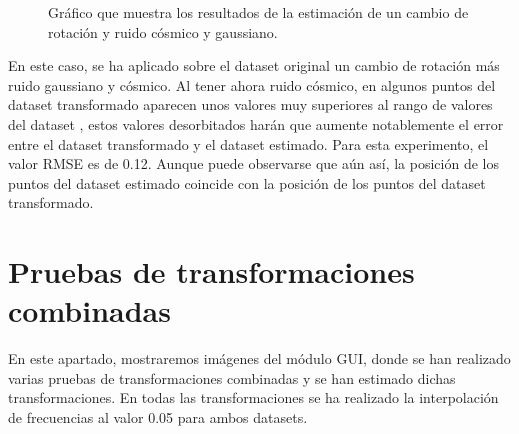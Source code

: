 \begin{figure}
\begin{center}
\hspace{0.5cm}

\end{center}

\caption{Gráfico que muestra los resultados de la estimación de un cambio de rotación y ruido cósmico y gaussiano.}
\end{figure}

En este caso, se ha aplicado sobre el dataset original un cambio de rotación más ruido gaussiano y cósmico. Al tener ahora ruido cósmico, en algunos puntos del dataset transformado aparecen unos valores muy superiores al rango de valores del dataset , estos valores desorbitados harán que aumente notablemente el error entre el dataset transformado y el dataset estimado. Para esta experimento, el valor RMSE es de 0.12. Aunque puede observarse que aún así, la posición de los puntos del dataset estimado coincide con la posición de los puntos del dataset transformado.




\section{Pruebas de transformaciones combinadas}

En este apartado, mostraremos imágenes del módulo GUI, donde se han realizado varias pruebas de transformaciones combinadas y se han estimado dichas transformaciones.
En todas las transformaciones se ha realizado la interpolación de frecuencias al valor 0.05 para ambos datasets.


